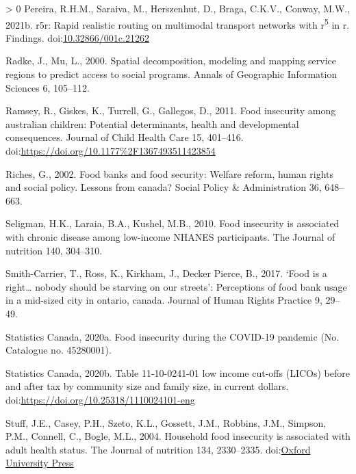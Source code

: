 \documentclass[]{elsarticle} %
\newlength{\cslhangindent}
\newenvironment{CSLReferences}[3] %
 {%
  \setlength{\parindent}{0pt}
  \ifodd #1 \everypar{\setlength{\hangindent}{\cslhangindent}}\ignorespaces\fi
  \ifnum #2 > 0
  \setlength{\parskip}{#2\baselineskip}
  \fi
 }%
 {}
\begin{document}
\begin{CSLReferences}{1}{0}
\leavevmode\hypertarget{ref-pereira2021r5r}{}%
Pereira, R.H.M., Saraiva, M., Herszenhut, D., Braga, C.K.V., Conway,
M.W., 2021b. r5r: Rapid realistic routing on multimodal transport
networks with r\textsuperscript{5} in r. Findings.
doi:\href{https://doi.org/10.32866/001c.21262}{10.32866/001c.21262}

\leavevmode\hypertarget{ref-radke2000spatial}{}%
Radke, J., Mu, L., 2000. Spatial decomposition, modeling and mapping
service regions to predict access to social programs. Annals of
Geographic Information Sciences 6, 105--112.

\leavevmode\hypertarget{ref-ramsey2011food}{}%
Ramsey, R., Giskes, K., Turrell, G., Gallegos, D., 2011. Food insecurity
among australian children: Potential determinants, health and
developmental consequences. Journal of Child Health Care 15, 401--416.
doi:\url{https://doi.org/10.1177\%2F1367493511423854}

\leavevmode\hypertarget{ref-riches2002food}{}%
Riches, G., 2002. Food banks and food security: Welfare reform, human
rights and social policy. Lessons from canada? Social Policy \&
Administration 36, 648--663.

\leavevmode\hypertarget{ref-seligman2010food}{}%
Seligman, H.K., Laraia, B.A., Kushel, M.B., 2010. Food insecurity is
associated with chronic disease among low-income NHANES participants.
The Journal of nutrition 140, 304--310.

\leavevmode\hypertarget{ref-smith2017food}{}%
Smith-Carrier, T., Ross, K., Kirkham, J., Decker Pierce, B., 2017.
{`Food is a right\ldots{} nobody should be starving on our streets'}:
Perceptions of food bank usage in a mid-sized city in ontario, canada.
Journal of Human Rights Practice 9, 29--49.

\leavevmode\hypertarget{ref-statisticscanada2020food}{}%
Statistics Canada, 2020a. Food insecurity during the COVID-19 pandemic
(No. Catalogue no. 45280001).

\leavevmode\hypertarget{ref-statisticscanada2020licos}{}%
Statistics Canada, 2020b. Table 11-10-0241-01 low income cut-offs
(LICOs) before and after tax by community size and family size, in
current dollars. doi:\url{https://doi.org/10.25318/1110024101-eng}

\leavevmode\hypertarget{ref-stuff2004household}{}%
Stuff, J.E., Casey, P.H., Szeto, K.L., Gossett, J.M., Robbins, J.M.,
Simpson, P.M., Connell, C., Bogle, M.L., 2004. Household food insecurity
is associated with adult health status. The Journal of nutrition 134,
2330--2335.
doi:\href{https://doi.org/Oxford\%20University\%20Press}{Oxford University Press}


\end{CSLReferences}
\end{document}
